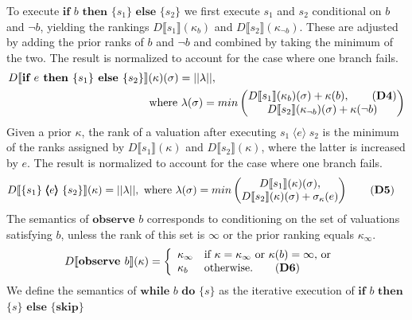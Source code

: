 \documentclass{llncs}
\newcommand{\dn}[1]{D\llbracket #1 \rrbracket}
\newcommand{\Rank}[1]{\hspace{3pt} \pmb{\langle} #1 \pmb{\rangle}\hspace{3pt} } %
\begin{document}
To execute $\textbf{if }b\textbf{ then }\{ s_1 \}\textbf{ else }\{ s_2 \}$ we first 
	execute $s_1$ and $s_2$ conditional on $b$ and $\neg b$,
		yielding the rankings $\dn{s_1}(\kappa_{b})$ and $\dn{s_2}(\kappa_{\neg b})$.
	These are adjusted by adding the prior ranks of $b$ and $\neg b$ and
		combined by taking the minimum of the two.
	The result is normalized to account for the case where one branch fails.
\begin{align*}
\dn{\textbf{if }e\textbf{ then }\{ s_1 \}\textbf{ else }\{ s_2 \}}(\kappa)(\sigma) & = || \lambda ||,   \\ 
			&  \hspace{-30pt} \mbox{ where }\lambda(\sigma) = min\begin{pmatrix} \dn{s_1}(\kappa_{b})(\sigma) + \kappa(b), \tag{\textbf{D4}} \\ \dn{s_2}(\kappa_{\neg b})(\sigma) + \kappa(\neg b) \end{pmatrix}  
\end{align*}
	Given a prior $\kappa$, the rank of a valuation after executing $s_1 \Rank{e} s_2$
		is the minimum of the ranks assigned by $\dn{s_1}(\kappa)$ and $\dn{s_2}(\kappa)$,
			where the latter is increased by $e$.
	The result is normalized to account for the case where one branch fails.
\begin{align}
\dn{\{ s_1 \} \Rank{e} \{ s_2 \}}(\kappa)	& = || \lambda ||, \mbox{ where }\lambda(\sigma) = min \begin{pmatrix} \dn{s_1}(\kappa)(\sigma), \\ \dn{s_2}(\kappa)(\sigma) + \sigma_{\kappa}(e) \end{pmatrix} \tag{\textbf{D5}} 
\end{align}
	The semantics of $\textbf{observe }b$ corresponds to conditioning on the set of valuations satisfying $b$, 
		unless the rank of this set is $\infty$ or the prior ranking equals $\kappa_{\infty}$.
\begin{align}
\dn{\textbf{observe }b}(\kappa)  & = 
		\left\{
			\begin{array}{ll}
				\kappa_{\infty}								& \mbox{if }\kappa = \kappa_\infty\mbox{ or }\kappa(b) = \infty\mbox{, or}\\
				\kappa_{b}								& \mbox{otherwise.}\tag{\textbf{D6}}
			\end{array}
		\right. 
\end{align}
	We define the semantics of $\textbf{while }b\textbf{ do }\{s\}$
		as the iterative execution of $\textbf{if }b$ $\textbf{then}$ $\{s\}$ $\textbf{else } \{\textbf{skip}\}$
\end{document}
